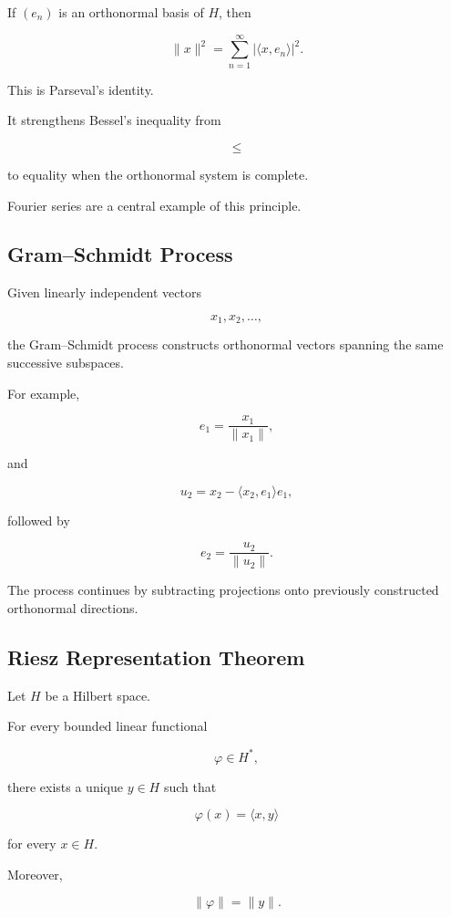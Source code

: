 If \((e_n)\) is an orthonormal basis of \(H\), then

\[
\boxed{
\|x\|^2
=
\sum_{n=1}^{\infty}
|\langle x,e_n\rangle|^2.
}
\]

This is Parseval's identity.

It strengthens Bessel's inequality from

\[
\leq
\]

to equality when the orthonormal system is complete.

Fourier series are a central example of this principle.

\subsection{Gram--Schmidt Process}
\label{subsec:gram-schmidt-functional}

Given linearly independent vectors

\[
x_1,x_2,\ldots,
\]

the Gram--Schmidt process constructs orthonormal vectors spanning the same
successive subspaces.

For example,

\[
e_1
=
\frac{x_1}{\|x_1\|},
\]

and

\[
u_2
=
x_2-\langle x_2,e_1\rangle e_1,
\]

followed by

\[
e_2
=
\frac{u_2}{\|u_2\|}.
\]

The process continues by subtracting projections onto previously
constructed orthonormal directions.

\subsection{Riesz Representation Theorem}
\label{subsec:riesz-representation-hilbert}

\begin{theorem}
Let \(H\) be a Hilbert space.

For every bounded linear functional

\[
\varphi\in H^*,
\]

there exists a unique \(y\in H\) such that

\[
\boxed{
\varphi(x)
=
\langle x,y\rangle
}
\]

for every \(x\in H\).

Moreover,

\[
\boxed{
\|\varphi\|
=
\|y\|.
}
\]
\end{theorem}

